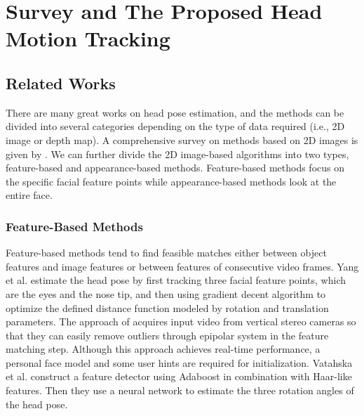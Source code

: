 \chapter{Survey and The Proposed Head Motion Tracking}
\label{c:related}

\section{Related Works}
There are many great works on head pose estimation, and the methods can be divided into several categories depending on the type of data required (i.e., 2D image or depth map). A comprehensive survey on methods based on 2D images is given by \cite{Murphy:09:SURVEY}. We can further divide the 2D image-based algorithms into two types, feature-based \cite{Yang:02:MBHPTWS,Vatahska:07:FBHPEFI,Matsumoto:00:AAFRTSVIOHPAGDM,Yao:04:EMBLHMRFM,Whitehill:08:ADATFBFHPT} and appearance-based \cite{Morency:03:PEU3VBE,Balasubramanian:07:BMEAFFPIHPE,Osadchy:07:SFDPEEBM,Storer:09:3DMAM,Chen:03:HPEUFML,Whitehill:08:ADATFBFHPT} methods. Feature-based methods focus on the specific facial feature points while appearance-based methods look at the entire face.

\subsection{Feature-Based Methods}
Feature-based methods tend to find feasible matches either between object features and image features or between features of consecutive video frames. Yang et al. \cite{Yang:99:USP} estimate the head pose by first tracking three facial feature points, which are the eyes and the nose tip, and then using gradient decent algorithm to optimize the defined distance function modeled by rotation and translation parameters. The approach of \cite{Yang:02:MBHPTWS} acquires input video from vertical stereo cameras so that they can easily remove outliers through epipolar system in the feature matching step. Although this approach achieves real-time performance, a personal face model and some user hints are required for initialization. Vatahska et al. \cite{Vatahska:07:FBHPEFI} construct a feature detector using Adaboost in combination with Haar-like features. Then they use a neural network to estimate the three rotation angles of the head pose.

